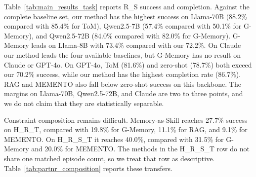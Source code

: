 \documentclass{article}
\theoremstyle{plain}
\theoremstyle{definition}
\theoremstyle{remark}
\begin{document}
Table~\ref{tab:main_results_task} reports R\_S success and completion. Against the complete baseline set, our method has the highest success on Llama-70B (88.2\% compared with 85.4\% for ToM), Qwen2.5-7B (57.4\% compared with 50.1\% for G-Memory), and Qwen2.5-72B (84.0\% compared with 82.0\% for G-Memory). G-Memory leads on Llama-8B with 73.4\% compared with our 72.2\%. On Claude our method leads the four available baselines, but G-Memory has no result on Claude or GPT-4o. On GPT-4o, ToM (81.6\%) and zero-shot (78.7\%) both exceed our 70.2\% success, while our method has the highest completion rate (86.7\%). RAG and MEMENTO also fall below zero-shot success on this backbone. The margins on Llama-70B, Qwen2.5-72B, and Claude are two to three points, and we do not claim that they are statistically separable.

Constraint composition remains difficult. Memory-as-Skill reaches 27.7\% success on H\_R\_T, compared with 19.8\% for G-Memory, 11.1\% for RAG, and 9.1\% for MEMENTO. On H\_R\_S\_T it reaches 40.0\%, compared with 31.5\% for G-Memory and 20.0\% for MEMENTO. The methods in the H\_R\_S\_T row do not share one matched episode count, so we treat that row as descriptive. Table~\ref{tab:partnr_composition} reports these transfers.

\begin{table}[H]
\centering
\caption{PARTNR transfer results with Llama-3.1-8B (success \%, $\uparrow$, best in bold). R\_S (R-only) is the setting reported in Table~\ref{tab:main_results_task}. R\_S (R+S) and the 3-/4-constraint rows are compositional transfers. H\_R\_S\_T uses the complete source union R+S+H\_R+H\_T.}
\label{tab:partnr_composition}
\end{table}
\end{document}
